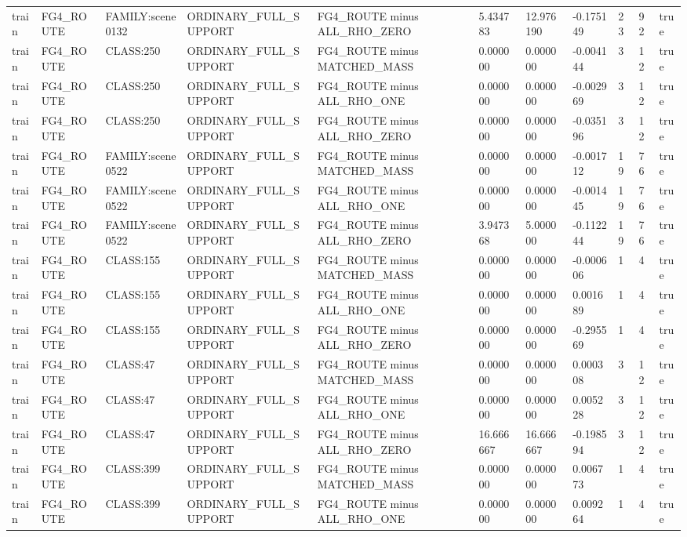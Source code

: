 \begin{tabular}{lllllllllll}
train & FG4\_ROUTE & FAMILY:scene0132 & ORDINARY\_FULL\_SUPPORT & FG4\_ROUTE minus ALL\_RHO\_ZERO & 5.434783 & 12.976190 & -0.175149 & 23 & 92 & true \\
train & FG4\_ROUTE & CLASS:250 & ORDINARY\_FULL\_SUPPORT & FG4\_ROUTE minus MATCHED\_MASS & 0.000000 & 0.000000 & -0.004144 & 3 & 12 & true \\
train & FG4\_ROUTE & CLASS:250 & ORDINARY\_FULL\_SUPPORT & FG4\_ROUTE minus ALL\_RHO\_ONE & 0.000000 & 0.000000 & -0.002969 & 3 & 12 & true \\
train & FG4\_ROUTE & CLASS:250 & ORDINARY\_FULL\_SUPPORT & FG4\_ROUTE minus ALL\_RHO\_ZERO & 0.000000 & 0.000000 & -0.035196 & 3 & 12 & true \\
train & FG4\_ROUTE & FAMILY:scene0522 & ORDINARY\_FULL\_SUPPORT & FG4\_ROUTE minus MATCHED\_MASS & 0.000000 & 0.000000 & -0.001712 & 19 & 76 & true \\
train & FG4\_ROUTE & FAMILY:scene0522 & ORDINARY\_FULL\_SUPPORT & FG4\_ROUTE minus ALL\_RHO\_ONE & 0.000000 & 0.000000 & -0.001445 & 19 & 76 & true \\
train & FG4\_ROUTE & FAMILY:scene0522 & ORDINARY\_FULL\_SUPPORT & FG4\_ROUTE minus ALL\_RHO\_ZERO & 3.947368 & 5.000000 & -0.112244 & 19 & 76 & true \\
train & FG4\_ROUTE & CLASS:155 & ORDINARY\_FULL\_SUPPORT & FG4\_ROUTE minus MATCHED\_MASS & 0.000000 & 0.000000 & -0.000606 & 1 & 4 & true \\
train & FG4\_ROUTE & CLASS:155 & ORDINARY\_FULL\_SUPPORT & FG4\_ROUTE minus ALL\_RHO\_ONE & 0.000000 & 0.000000 & 0.001689 & 1 & 4 & true \\
train & FG4\_ROUTE & CLASS:155 & ORDINARY\_FULL\_SUPPORT & FG4\_ROUTE minus ALL\_RHO\_ZERO & 0.000000 & 0.000000 & -0.295569 & 1 & 4 & true \\
train & FG4\_ROUTE & CLASS:47 & ORDINARY\_FULL\_SUPPORT & FG4\_ROUTE minus MATCHED\_MASS & 0.000000 & 0.000000 & 0.000308 & 3 & 12 & true \\
train & FG4\_ROUTE & CLASS:47 & ORDINARY\_FULL\_SUPPORT & FG4\_ROUTE minus ALL\_RHO\_ONE & 0.000000 & 0.000000 & 0.005228 & 3 & 12 & true \\
train & FG4\_ROUTE & CLASS:47 & ORDINARY\_FULL\_SUPPORT & FG4\_ROUTE minus ALL\_RHO\_ZERO & 16.666667 & 16.666667 & -0.198594 & 3 & 12 & true \\
train & FG4\_ROUTE & CLASS:399 & ORDINARY\_FULL\_SUPPORT & FG4\_ROUTE minus MATCHED\_MASS & 0.000000 & 0.000000 & 0.006773 & 1 & 4 & true \\
train & FG4\_ROUTE & CLASS:399 & ORDINARY\_FULL\_SUPPORT & FG4\_ROUTE minus ALL\_RHO\_ONE & 0.000000 & 0.000000 & 0.009264 & 1 & 4 & true \\

\end{tabular}
